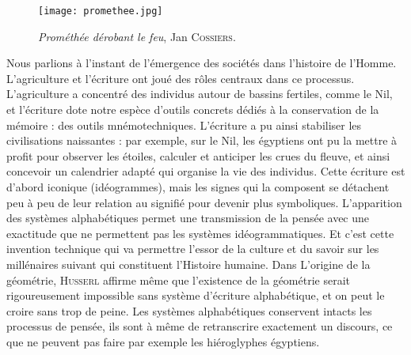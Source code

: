 \documentclass[a4paper,14pt]{extreport}
\begin{document}
\begin{figure}[ht]
 \begin{center}
  \texttt{[image: promethee.jpg]}
 \end{center}
    \caption{\textit{Prométhée dérobant le feu}, Jan \textsc{Cossiers}.}
 \label{cossiers}
\end{figure}

Nous parlions à l'instant de l'émergence des sociétés dans l'histoire de l'Homme. L'agriculture et l'écriture ont joué des rôles centraux dans ce processus. L'agriculture a concentré des individus autour de bassins fertiles, comme le Nil, et l'écriture dote notre espèce d'outils concrets dédiés à la conservation de la mémoire : des outils mnémotechniques. L'écriture a pu ainsi stabiliser les civilisations naissantes : par exemple, sur le Nil, les égyptiens ont pu la mettre à profit pour observer les étoiles, calculer et anticiper les crues du fleuve, et ainsi concevoir un calendrier adapté qui organise la vie des individus. Cette écriture est d'abord iconique (idéogrammes), mais les signes qui la composent se détachent peu à peu de leur relation au signifié pour devenir plus symboliques. L'apparition des systèmes alphabétiques permet une transmission de la pensée avec une exactitude que ne permettent pas les systèmes idéogrammatiques. Et c'est cette invention technique qui va permettre l'essor de la culture et du savoir sur les millénaires suivant qui constituent l'Histoire humaine. Dans L'origine de la géométrie, \textsc{Husserl} affirme même que l'existence de la géométrie serait rigoureusement impossible sans système d'écriture alphabétique, et on peut le croire sans trop de peine. Les systèmes alphabétiques conservent intacts les processus de pensée, ils sont à même de retranscrire exactement un discours, ce que ne peuvent pas faire par exemple les hiéroglyphes égyptiens.
\end{document}
